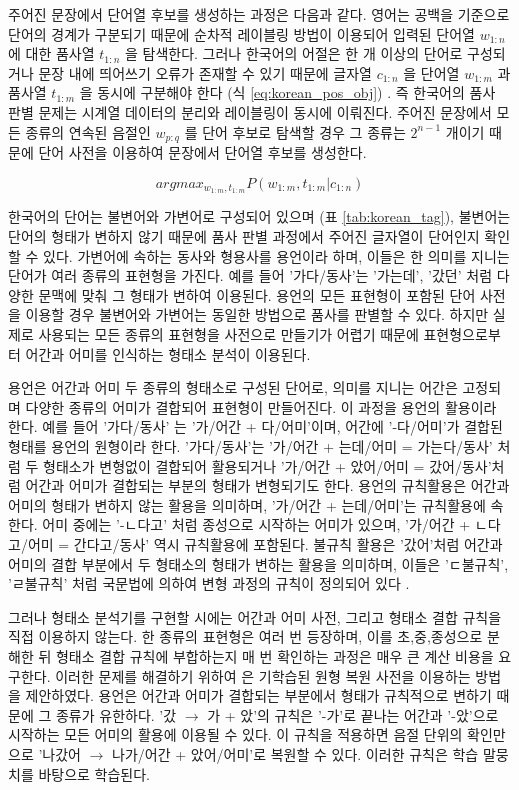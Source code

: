 \documentclass[11pt]{article}
\begin{document}
주어진 문장에서 단어열 후보를 생성하는 과정은 다음과 같다.
영어는 공백을 기준으로 단어의 경계가 구분되기 때문에 순차적 레이블링 방법이 이용되어 입력된 단어열 $w_{1:n}$ 에 대한 품사열 $t_{1:n}$ 을 탐색한다.
그러나 한국어의 어절은 한 개 이상의 단어로 구성되거나 문장 내에 띄어쓰기 오류가 존재할 수 있기 때문에 글자열 $c_{1:n}$ 을 단어열 $w_{1:m}$ 과 품사열 $t_{1:m}$ 을 동시에 구분해야 한다 (식 \ref{eq:korean_pos_obj}) \cite{lee2011koreanpos}.
즉 한국어의 품사 판별 문제는 시계열 데이터의 분리와 레이블링이 동시에 이뤄진다.
주어진 문장에서 모든 종류의 연속된 음절인 $w_{p:q}$ 를 단어 후보로 탐색할 경우 그 종류는 $2^{n-1}$ 개이기 때문에 단어 사전을 이용하여 문장에서 단어열 후보를 생성한다.

\begin{equation}
\label{eq:korean_pos_obj}
arg max_{w_{1:m},t_{1:m}} P(w_{1:m}, t_{1:m} \vert c_{1:n})
\end{equation}

한국어의 단어는 불변어와 가변어로 구성되어 있으며 (표 \ref{tab:korean_tag}), 불변어는 단어의 형태가 변하지 않기 때문에 품사 판별 과정에서 주어진 글자열이 단어인지 확인할 수 있다.
가변어에 속하는 동사와 형용사를 용언이라 하며, 이들은 한 의미를 지니는 단어가 여러 종류의 표현형을 가진다.
예를 들어 '가다/동사'는 '가는데', '갔던' 처럼 다양한 문맥에 맞춰 그 형태가 변하여 이용된다.
용언의 모든 표현형이 포함된 단어 사전을 이용할 경우 불변어와 가변어는 동일한 방법으로 품사를 판별할 수 있다.
하지만 실제로 사용되는 모든 종류의 표현형을 사전으로 만들기가 어렵기 때문에 표현형으로부터 어간과 어미를 인식하는 형태소 분석이 이용된다.

용언은 어간과 어미 두 종류의 형태소로 구성된 단어로, 의미를 지니는 어간은 고정되며 다양한 종류의 어미가 결합되어 표현형이 만들어진다.
이 과정을 용언의 활용이라 한다.
예를 들어 '가다/동사' 는 '가/어간 + 다/어미'이며, 어간에 '-다/어미'가 결합된 형태를 용언의 원형이라 한다.
'가다/동사'는 '가/어간 + 는데/어미 = 가는다/동사' 처럼 두 형태소가 변형없이 결합되어 활용되거나 '가/어간 + 았어/어미 = 갔어/동사'처럼 어간과 어미가 결합되는 부분의 형태가 변형되기도 한다.
용언의 규칙활용은 어간과 어미의 형태가 변하지 않는 활용을 의미하며, '가/어간 + 는데/어미'는 규칙활용에 속한다.
어미 중에는 '-ㄴ다고' 처럼 종성으로 시작하는 어미가 있으며, '가/어간 + ㄴ다고/어미 = 간다고/동사' 역시 규칙활용에 포함된다.
불규칙 활용은 '갔어'처럼 어간과 어미의 결합 부분에서 두 형태소의 형태가 변하는 활용을 의미하며, 이들은 'ㄷ불규칙', 'ㄹ불규칙' 처럼 국문법에 의하여 변형 과정의 규칙이 정의되어 있다 \cite{kang1995syllable}.

그러나 형태소 분석기를 구현할 시에는 어간과 어미 사전, 그리고 형태소 결합 규칙을 직접 이용하지 않는다.
한 종류의 표현형은 여러 번 등장하며, 이를 초,중,종성으로 분해한 뒤 형태소 결합 규칙에 부합하는지 매 번 확인하는 과정은 매우 큰 계산 비용을 요구한다.
이러한 문제를 해결하기 위하여 \cite{shim2013syllable} 은 기학습된 원형 복원 사전을 이용하는 방법을 제안하였다.
용언은 어간과 어미가 결합되는 부분에서 형태가 규칙적으로 변하기 때문에 그 종류가 유한하다.
'갔 $\rightarrow$ 가 + 았'의 규칙은 '-가'로 끝나는 어간과 '-았'으로 시작하는 모든 어미의 활용에 이용될 수 있다.
이 규칙을 적용하면 음절 단위의 확인만으로 '나갔어 $\rightarrow$ 나가/어간 + 았어/어미'로 복원할 수 있다.
이러한 규칙은 학습 말뭉치를 바탕으로 학습된다.
\end{document}
